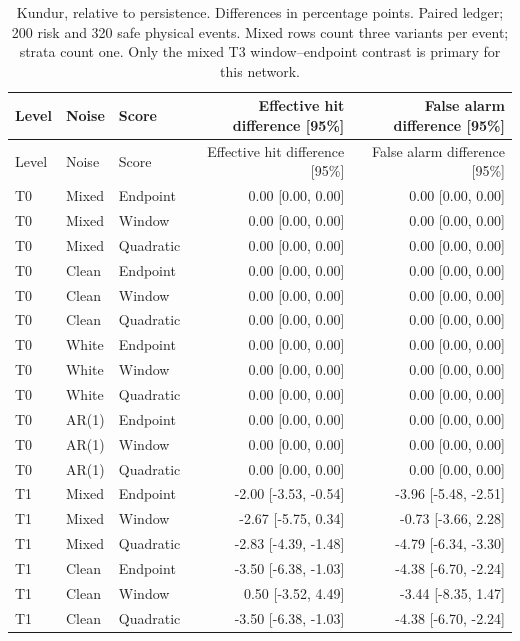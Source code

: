\documentclass[10pt]{article}
\begin{document}
\begingroup\small\setlength{\tabcolsep}{3.8pt}
\begin{longtable}{lllrr}
\caption{Kundur, relative to persistence. Differences in percentage points. Paired ledger; 200 risk and 320 safe physical events. Mixed rows count three variants per event; strata count one. Only the mixed T3 window--endpoint contrast is primary for this network.}\\
\toprule Level & Noise & Score & Effective hit difference [95\%] & False alarm difference [95\%] \\\midrule\endfirsthead
\toprule Level & Noise & Score & Effective hit difference [95\%] & False alarm difference [95\%] \\\midrule\endhead
T0 & Mixed & Endpoint & 0.00 [0.00, 0.00] & 0.00 [0.00, 0.00] \\
T0 & Mixed & Window & 0.00 [0.00, 0.00] & 0.00 [0.00, 0.00] \\
T0 & Mixed & Quadratic & 0.00 [0.00, 0.00] & 0.00 [0.00, 0.00] \\
T0 & Clean & Endpoint & 0.00 [0.00, 0.00] & 0.00 [0.00, 0.00] \\
T0 & Clean & Window & 0.00 [0.00, 0.00] & 0.00 [0.00, 0.00] \\
T0 & Clean & Quadratic & 0.00 [0.00, 0.00] & 0.00 [0.00, 0.00] \\
T0 & White & Endpoint & 0.00 [0.00, 0.00] & 0.00 [0.00, 0.00] \\
T0 & White & Window & 0.00 [0.00, 0.00] & 0.00 [0.00, 0.00] \\
T0 & White & Quadratic & 0.00 [0.00, 0.00] & 0.00 [0.00, 0.00] \\
T0 & AR(1) & Endpoint & 0.00 [0.00, 0.00] & 0.00 [0.00, 0.00] \\
T0 & AR(1) & Window & 0.00 [0.00, 0.00] & 0.00 [0.00, 0.00] \\
T0 & AR(1) & Quadratic & 0.00 [0.00, 0.00] & 0.00 [0.00, 0.00] \\
T1 & Mixed & Endpoint & -2.00 [-3.53, -0.54] & -3.96 [-5.48, -2.51] \\
T1 & Mixed & Window & -2.67 [-5.75, 0.34] & -0.73 [-3.66, 2.28] \\
T1 & Mixed & Quadratic & -2.83 [-4.39, -1.48] & -4.79 [-6.34, -3.30] \\
T1 & Clean & Endpoint & -3.50 [-6.38, -1.03] & -4.38 [-6.70, -2.24] \\
T1 & Clean & Window & 0.50 [-3.52, 4.49] & -3.44 [-8.35, 1.47] \\
T1 & Clean & Quadratic & -3.50 [-6.38, -1.03] & -4.38 [-6.70, -2.24] \\

\end{longtable}
\end{document}
